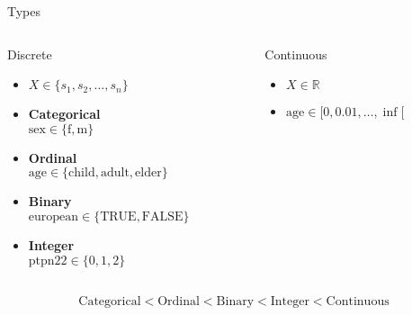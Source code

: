 \documentclass{beamer}\usepackage[]{graphicx}\usepackage[]{color}
\begin{document}
\begin{frame}{Types}
  \begin{columns}[t]
    \begin{column}{.5\linewidth}
      \begin{exampleblock}{Discrete}
        \begin{itemize}
          \item $X \in \{s_1, s_2, \dots, s_n\}$
          \item {\bf Categorical} \\ 
            $\text{sex} \in \{\text{f}, \text{m}\}$
          \item {\bf Ordinal} 
            \\ $\text{age} \in \{\text{child}, \text{adult}, \text{elder}\}$
          \item {\bf Binary} 
            \\ $\text{european} \in \{\text{TRUE}, \text{FALSE}\}$
          \item {\bf Integer} 
            \\ $\text{ptpn22} \in \{0, 1, 2\}$
        \end{itemize}
      \end{exampleblock}
    \end{column}
    \begin{column}{.5\linewidth}
      \begin{exampleblock}{Continuous}
        \begin{itemize}
          \item $X \in \mathbb{R}$
          \item $\text{age} \in [0, 0.01, \dots, \inf[$
        \end{itemize}
      \end{exampleblock}
    \end{column}
  \end{columns}
  \begin{align*}
    \text{Categorical} < \text{Ordinal} < \text{Binary} < \text{Integer} <
    \text{Continuous}
  \end{align*}
\end{frame}
\end{document}
